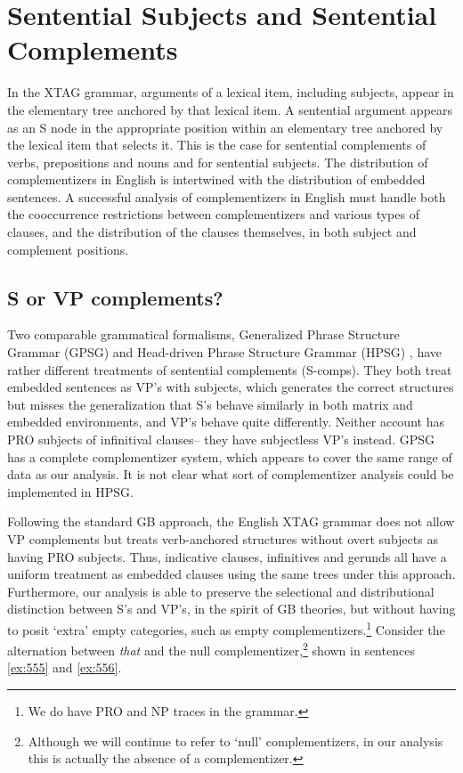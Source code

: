  
\chapter{Sentential Subjects and Sentential Complements} 
\label{scomps-section} 
 
In the XTAG grammar, arguments of a lexical item, including 
subjects, appear in the elementary tree anchored by that lexical item.  A 
sentential argument appears as an S node in the appropriate position 
within an elementary tree anchored by the lexical item that selects 
it. This is the case for sentential complements of verbs, prepositions 
and nouns and for sentential subjects. The distribution of 
complementizers in English is intertwined with the distribution of 
embedded sentences.  A successful analysis of complementizers in 
English must handle both the cooccurrence restrictions between 
complementizers and various types of clauses, and the distribution of 
the clauses themselves, in both subject and complement positions. 
 
\section{S or VP complements?} 
 
Two comparable grammatical formalisms, Generalized Phrase Structure 
Grammar (GPSG) \cite{gazdar85} and Head-driven Phrase Structure 
Grammar (HPSG) \cite{PollardSag94:BK}, have rather different 
treatments of sentential complements (S-comps).  They both treat 
embedded sentences as VP's with subjects, which generates the correct 
structures but misses the generalization that S's behave similarly in 
both matrix and embedded environments, and VP's behave quite 
differently.  Neither account has PRO\label{PRO} subjects of 
infinitival clauses-- they have subjectless VP's instead.  GPSG has a 
complete complementizer system, which appears to cover the same range 
of data as our analysis.  It is not clear what sort of complementizer 
analysis could be implemented in HPSG. 
 
Following the standard GB approach, the English XTAG grammar does not 
allow VP complements but treats verb-anchored structures without overt 
subjects as having PRO subjects. Thus, indicative clauses, infinitives 
and gerunds all have a uniform treatment as embedded clauses using the 
same trees under this approach. Furthermore, our analysis is able to 
preserve the selectional and distributional distinction between S's and 
VP's, in the spirit of GB theories, but without having to posit `extra' 
empty categories, such as empty complementizers.\footnote{We do have PRO and NP traces in the grammar.} Consider the alternation between {\it that} and the null complementizer,\footnote{Although we will continue to refer to `null' complementizers, in our analysis this is actually the absence of a complementizer.} shown in sentences \ref{ex:555} and \ref{ex:556}. 
 

